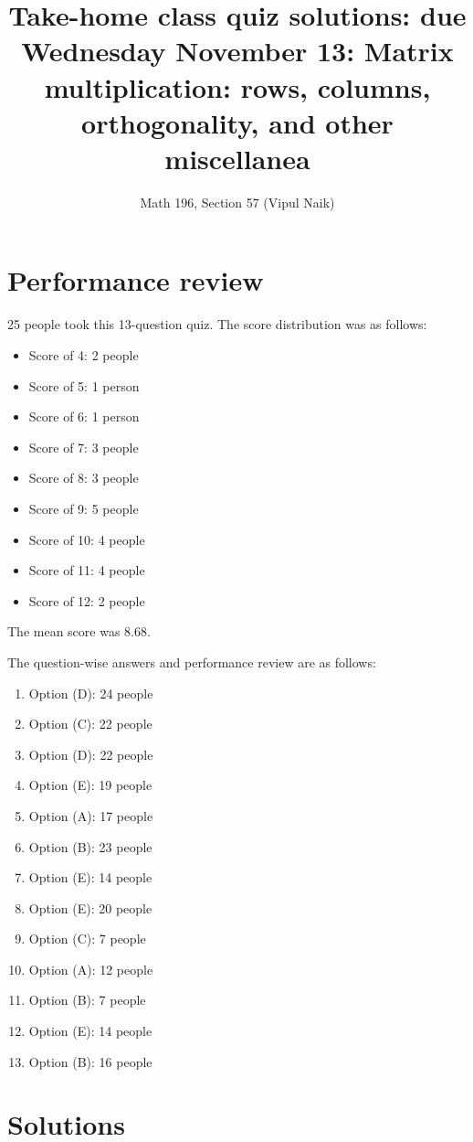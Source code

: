 \documentclass[10pt]{amsart}
\title{Take-home class quiz solutions: due Wednesday November 13: Matrix multiplication: rows, columns, orthogonality, and other miscellanea}
\author{Math 196, Section 57 (Vipul Naik)}
\begin{document}
\maketitle

\section{Performance review}

25 people took this 13-question quiz. The score distribution was as follows:

\begin{itemize}
\item Score of 4: 2 people
\item Score of 5: 1 person
\item Score of 6: 1 person
\item Score of 7: 3 people
\item Score of 8: 3 people
\item Score of 9: 5 people
\item Score of 10: 4 people
\item Score of 11: 4 people
\item Score of 12: 2 people
\end{itemize}

The mean score was 8.68.

The question-wise answers and performance review are as follows:

\begin{enumerate}
\item Option (D): 24 people
\item Option (C): 22 people
\item Option (D): 22 people
\item Option (E): 19 people
\item Option (A): 17 people
\item Option (B): 23 people
\item Option (E): 14 people
\item Option (E): 20 people
\item Option (C): 7 people
\item Option (A): 12 people
\item Option (B): 7 people
\item Option (E): 14 people
\item Option (B): 16 people
\end{enumerate}

\section{Solutions}
\end{document}
